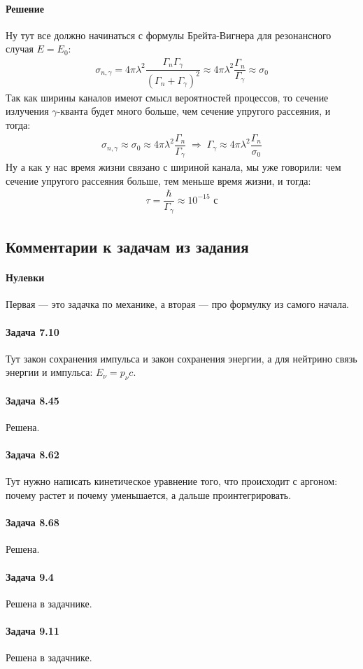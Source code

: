 \documentclass[12pt]{article}
\begin{document}
\paragraph{Решение}
Ну тут все должно начинаться с формулы Брейта-Вигнера для резонансного случая $E = E_0$:
\begin{gather*}
    \sigma_{n, \gamma} = 4\pi \lambda^2 \dfrac{\Gamma_n \Gamma_{\gamma}}{(\Gamma_n +\Gamma_{\gamma})^2} \approx 4\pi \lambda^2 \dfrac{\Gamma_n}{\Gamma_{\gamma}} \approx \sigma_0
\end{gather*}
Так как ширины каналов имеют смысл вероятностей процессов, то сечение излучения $\gamma$-кванта будет много больше, чем сечение упругого рассеяния, и тогда:
\begin{gather*}
    \sigma_{n, \gamma}  \approx \sigma_0 \approx 4\pi \lambda^2 \dfrac{\Gamma_n}{\Gamma_{\gamma}} \;\Rightarrow\; \Gamma_{\gamma} \approx  4\pi \lambda^2 \dfrac{\Gamma_n}{\sigma_0}
\end{gather*}
Ну а как у нас время жизни связано с шириной канала, мы уже говорили: чем сечение упругого рассеяния больше, тем меньше время жизни, и тогда:
\begin{gather*}
    \tau = \dfrac{\hbar}{\Gamma_{\gamma}} \approx 10^{-15} \text{ с}
\end{gather*}

\subsection{Комментарии к задачам из задания}
\paragraph{Нулевки} Первая --- это задачка по механике, а вторая --- про формулку из самого начала.
\paragraph{Задача 7.10} Тут закон сохранения импульса и закон сохранения энергии, а для нейтрино связь энергии и импульса: $E_{\nu} = p_{\nu}c$.
\paragraph{Задача 8.45} Решена.
\paragraph{Задача 8.62} Тут нужно написать кинетическое уравнение того, что происходит с аргоном: почему растет и почему уменьшается, а дальше проинтегрировать. 
\paragraph{Задача 8.68} Решена.
\paragraph{Задача 9.4} Решена в задачнике.
\paragraph{Задача 9.11} Решена в задачнике.
\end{document}
